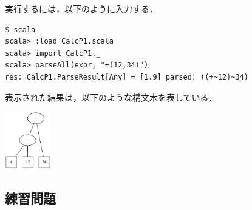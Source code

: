 \documentclass[a4j]{jsarticle}
\begin{document}
実行するには，以下のように入力する．

\begin{verbatim}
$ scala
scala> :load CalcP1.scala
scala> import CalcP1._
scala> parseAll(expr, "+(12,34)")
res: CalcP1.ParseResult[Any] = [1.9] parsed: ((+~12)~34)
\end{verbatim}

表示された結果は，以下のような構文木を表している．

\begin{center}

\includegraphics[width=0.15\textwidth]{images/scala-parse-tree2_606648ec1cbbbdeec1fc1887f438f8b6c2a3c21a.png}

\end{center}
\subsection{練習問題}
\label{sec-4-2}
\end{document}
